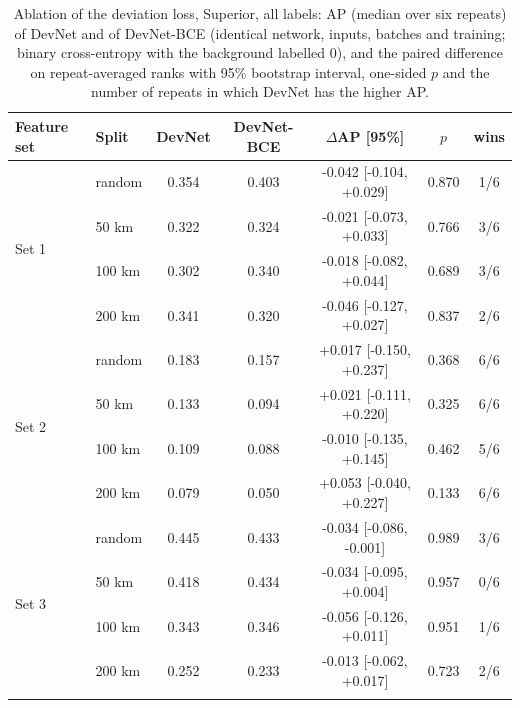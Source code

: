 \documentclass[pdflatex,sn-apa]{sn-jnl}
\begin{document}
\begin{table}[t]
\caption{Ablation of the deviation loss, Superior, all labels: AP (median over six repeats) of DevNet and of DevNet-BCE (identical network, inputs, batches and training; binary cross-entropy with the background labelled 0), and the paired difference on repeat-averaged ranks with 95\% bootstrap interval, one-sided $p$ and the number of repeats in which DevNet has the higher AP.}\label{tab:loss-ablation}
\footnotesize
\setlength{\tabcolsep}{3pt}
\begin{tabular*}{\textwidth}{@{\extracolsep\fill}llccccc}
\toprule
Feature set & Split & DevNet & DevNet-BCE & $\Delta$AP [95\%] & $p$ & wins \\
\midrule
\multirow{4}{*}{Set 1} & random & 0.354 & 0.403 & -0.042 [-0.104, +0.029] & 0.870 & 1/6 \\
 & 50 km & 0.322 & 0.324 & -0.021 [-0.073, +0.033] & 0.766 & 3/6 \\
 & 100 km & 0.302 & 0.340 & -0.018 [-0.082, +0.044] & 0.689 & 3/6 \\
 & 200 km & 0.341 & 0.320 & -0.046 [-0.127, +0.027] & 0.837 & 2/6 \\
\midrule
\multirow{4}{*}{Set 2} & random & 0.183 & 0.157 & +0.017 [-0.150, +0.237] & 0.368 & 6/6 \\
 & 50 km & 0.133 & 0.094 & +0.021 [-0.111, +0.220] & 0.325 & 6/6 \\
 & 100 km & 0.109 & 0.088 & -0.010 [-0.135, +0.145] & 0.462 & 5/6 \\
 & 200 km & 0.079 & 0.050 & +0.053 [-0.040, +0.227] & 0.133 & 6/6 \\
\midrule
\multirow{4}{*}{Set 3} & random & 0.445 & 0.433 & -0.034 [-0.086, -0.001] & 0.989 & 3/6 \\
 & 50 km & 0.418 & 0.434 & -0.034 [-0.095, +0.004] & 0.957 & 0/6 \\
 & 100 km & 0.343 & 0.346 & -0.056 [-0.126, +0.011] & 0.951 & 1/6 \\
 & 200 km & 0.252 & 0.233 & -0.013 [-0.062, +0.017] & 0.723 & 2/6 \\
\botrule
\end{tabular*}
\end{table}
\end{document}
